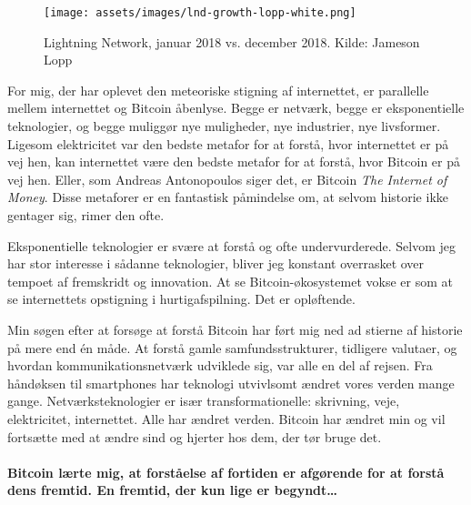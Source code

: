 \begin{figure}[htbp]
  \centering
  \texttt{[image: assets/images/lnd-growth-lopp-white.png]}
  \caption{Lightning Network, januar 2018 vs. december 2018. Kilde: 
  Jameson Lopp}
  \label{fig:lnd-growth-lopp-white.png}
\end{figure}

For mig, der har oplevet den meteoriske stigning af internettet, er parallelle
mellem internettet og Bitcoin åbenlyse. Begge er netværk, begge
er eksponentielle teknologier, og begge muliggør nye muligheder, nye
industrier, nye livsformer. Ligesom elektricitet var den bedste
metafor for at forstå, hvor internettet er på vej hen, kan internettet
være den bedste metafor for at forstå, hvor Bitcoin er på vej hen. Eller, som
Andreas Antonopoulos siger det, er Bitcoin \textit{The Internet of Money}.
Disse metaforer er en fantastisk påmindelse om, at selvom historie ikke gentager
sig, rimer den ofte.

Eksponentielle teknologier er svære at forstå og ofte undervurderede.
Selvom jeg har stor interesse i sådanne teknologier, bliver jeg
konstant overrasket over tempoet af fremskridt og innovation. At se
Bitcoin-økosystemet vokse er som at se internettets opstigning i
hurtigafspilning. Det er opløftende.

Min søgen efter at forsøge at forstå Bitcoin har ført mig ned ad stierne
af historie på mere end én måde. At forstå gamle samfundsstrukturer, 
tidligere valutaer, og hvordan kommunikationsnetværk udviklede sig, var alle
en del af rejsen. Fra håndøksen til smartphones har teknologi
utvivlsomt ændret vores verden mange gange. Netværksteknologier
er især transformationelle: skrivning, veje, elektricitet, internettet.
Alle har ændret verden. Bitcoin har ændret min og
vil fortsætte med at ændre sind og hjerter hos dem, der tør bruge
det.

\paragraph{Bitcoin lærte mig, at forståelse af fortiden er afgørende for
at forstå dens fremtid. En fremtid, der kun lige er begyndt\ldots}


